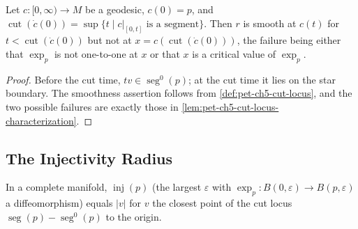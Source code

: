 \begin{corollary}
  \label{cor:pet-ch5-cut-locus-smoothness}

  Let $c:[0,\infty)\to M$ be a geodesic, $c(0)=p$, and
  $\operatorname{cut}(\dot c(0))=\sup\{t\mid c|_{[0,t]}\text{ is a segment}\}$. Then
  $r$ is smooth at $c(t)$ for $t<\operatorname{cut}(\dot c(0))$ but not at
  $x=c(\operatorname{cut}(\dot c(0)))$, the failure being either that $\exp_p$ is
  not one-to-one at $x$ or that $x$ is a critical value of $\exp_p$.
\end{corollary}
\begin{proof}
  \sketch
  Before the cut time, $tv\in\operatorname{seg}^0(p)$; at the cut time it lies on
  the star boundary.  The smoothness assertion follows from
  \cref{def:pet-ch5-cut-locus}, and the two possible failures are exactly those in
  \cref{lem:pet-ch5-cut-locus-characterization}.
\end{proof}

\subsection{The Injectivity Radius}

\begin{remark}
  \label{rem:pet-ch5-injectivity-radius-cut-locus}

  In a complete manifold, $\operatorname{inj}(p)$ (the largest $\varepsilon$ with
  $\exp_p:B(0,\varepsilon)\to B(p,\varepsilon)$ a diffeomorphism) equals $|v|$ for
  $v$ the closest point of the cut locus
  $\operatorname{seg}(p)-\operatorname{seg}^0(p)$ to the origin.
\end{remark}

